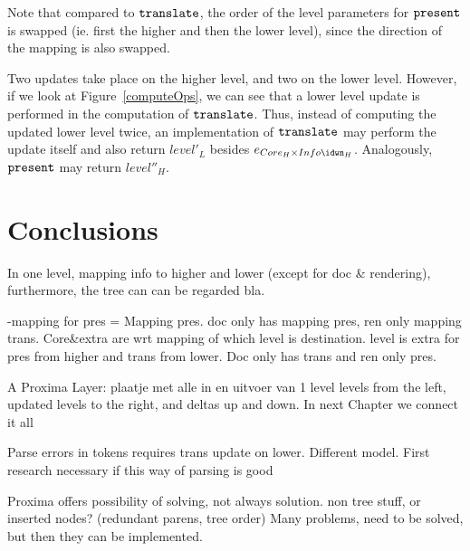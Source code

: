 Note that compared to ${\tt translate}$, the order of the level parameters for 
${\tt present}$ is swapped (ie. first the higher and then the lower level), since the direction of the mapping is also swapped. 

Two updates take place on the higher level, and two on the lower level. However, if we look at Figure~\ref{computeOps}, we can see that a lower level update is performed in the computation of
 ${\tt translate}$. Thus, instead of computing the updated lower level twice, an implementation of 
 ${\tt translate}$ may perform the update itself and also return $level'_{L}$ besides
 $e_{Core_{H} \times Info\idwn_{H}}$.  Analogously, ${\tt present}$ may return $level''_{H}$. 
 



%																
\section{Conclusions}

\toHere     %

In one level,  mapping info to higher and lower (except for doc \& rendering), furthermore, the tree can can be regarded bla.

-mapping for pres = Mapping pres. doc only has mapping pres, ren only mapping trans. Core\&extra are wrt mapping of which level is destination. level is extra for pres from higher and trans from lower. Doc only has trans  and ren only pres.

A Proxima Layer:
plaatje met alle in en uitvoer van 1 level
levels from the left, updated levels to the right, and deltas up and down. In next Chapter we connect it all


Parse errors in tokens requires trans update on lower. Different model. First research necessary if this way of parsing is good

Proxima offers possibility of solving, not always solution. non tree stuff, or inserted nodes? (redundant parens, tree order) Many problems, need to be solved, but then they can be implemented.



